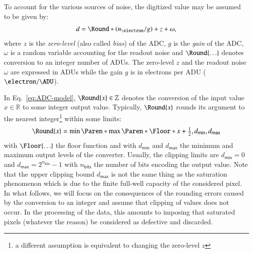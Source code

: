 \documentclass{aa}
\newcommand*{\Set}[1]{\mathbb{#1}}
\newcommand*{\Reals}{\Set{R}}
\newcommand*{\Integers}{\Set{Z}}
\newcommand*{\Tag}[1]{\mathsf{#1}}
\newcommand*{\textfrac}[2]{\ensuremath{\textstyle\frac{#1}{#2}}}
\begin{document}
To account for the various sources of noise, the digitized value may be assumed
to be given by:
\begin{equation}
  d = \Round*{(n_{\electron}/g) + z + \omega},
  \label{eq:ADC-model}
\end{equation}
where $z$ is the \emph{zero-level} (also called \emph{bias}) of the ADC, $g$ is
the \emph{gain} of the ADC, $\omega$ is a random variable accounting for the
readout noise and $\Round{\ldots}$ denotes conversion to an integer number of
ADUs.  The zero-level $z$ and the readout noise $\omega$ are expressed in ADUs
while the gain $g$ is in electrons per ADU ($\electron/\ADU$).

In Eq.~\eqref{eq:ADC-model}, $\Round{x} \in \Integers$ denotes the conversion
of the input value $x \in \Reals$ to some integer output value. Typically,
$\Round{x}$ rounds its argument to the nearest integer\footnote{a different
assumption is equivalent to changing the zero-level $z$} within some limits:
\begin{equation}
  \Round{x} = \min\Paren*{
    \max\Paren*{
      \Floor*{x + \textfrac12}, d_\Tag{min}
    }, d_\Tag{max}
  }
  \label{eq:digitization}
\end{equation}
with $\Floor{\ldots}$ the floor function and with $d_\Tag{min}$ and
$d_\Tag{max}$ the minimum and maximum output levels of the converter. Usually,
the clipping limits are $d_\Tag{min} = 0$ and $d_\Tag{max} = 2^{n_\Tag{bits}} -
1$ with $n_\Tag{bits}$ the number of bits encoding the output value. Note that
the upper clipping bound $d_\Tag{max}$ is not the same thing as the saturation
phenomenon which is due to the finite full-well capacity of the considered
pixel.  In what follows, we will focus on the consequences of the rounding
errors caused by the conversion to an integer and assume that clipping of
values does not occur. In the processing of the data, this amounts to imposing
that saturated pixels (whatever the reason) be considered as defective and
discarded.
\end{document}
